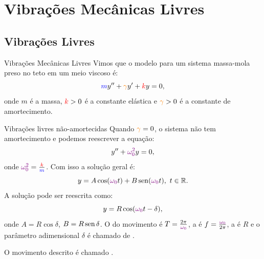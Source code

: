 \section{Vibrações Mecânicas Livres}

\subsection{Vibrações Livres}

\begin{frame}{Vibrações Mecânicas Livres}
Vimos que o modelo para um sistema massa-mola preso no teto em um meio viscoso é:
\[{\color{blue}m}y''+{\color{orange}\gamma} y'+{\color{red}k}y =0,\]
onde {\color{blue}$m$} é a massa, ${\color{red}k}>0$ é a constante elástica e   ${\color{orange}\gamma}>0$ é a constante de amortecimento.
\end{frame}

\begin{frame}{Vibrações livres não-amortecidas}
Quando ${\color{orange}\gamma}=0$, o sistema não tem amortecimento e podemos reescrever a equação:
\[y''+{\color{violet}\omega_0^2}y =0,\]
onde ${\color{violet}\omega_0^2}=\frac{{\color{red}k}}{{\color{blue}m}}$. Com isso a solução geral é:
\[y=A\cos({\color{violet}\omega_0}t)+B\sen({\color{violet}\omega_0}t),\ t\in \R.\]
 A solução pode ser reescrita como:
\[y=R\cos({\color{violet}\omega_0}t-\delta),\]
onde $A=R\cos\delta$, $B=R\operatorname{sen} \delta$. O  do movimento é $T=\frac{2\pi}{{\color{violet}\omega_0}}$, a  é $f=\frac{{\color{violet}\omega_0}}{2\pi}$, a  é $R$ e o parâmetro adimensional $\delta$ é chamado de .

\end{frame}


\begin{frame}
O movimento descrito é chamado .
\begin{center}
\end{center}

\end{frame}

